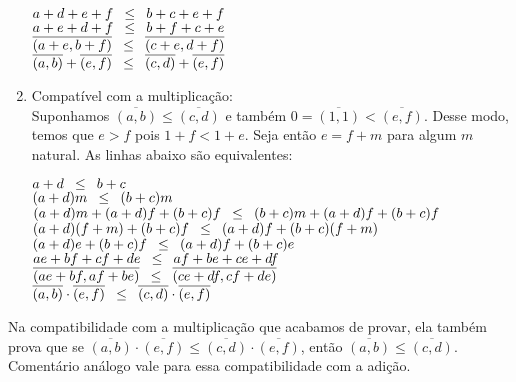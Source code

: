 \documentclass[../main.tex]{subfiles}
\begin{document}
\begin{dem}
\begin{enumerate}[label=(\roman*)]
\begin{center}
            $a + d +e+f \hspace{8pt} {\leq} \hspace{8pt} b + c + e+f$ \\
            $a + e + d +f \hspace{8pt} {\leq} \hspace{8pt} b + f + c + e$ \\
            $\overline{(a+e,b+f)} \hspace{8pt} {\leq} \hspace{8pt} \overline{(c+e, d+f)}$ \\
            $\overline{(a,b)} + \overline{(e,f)} \hspace{8pt} {\leq} \hspace{8pt} \overline{(c,d)} + \overline{(e,f)}$

        \end{center}

        
        \item Compatível com a multiplicação: \\
        Suponhamos $\overline{(a,b)} \leq \overline{(c,d)}$ e também $0 = \overline{(1,1)} < \overline{(e,f)}$.
        Desse modo, temos que $e > f$ pois $1+f < 1+e$. Seja então $e = f+m$ para algum $m$ natural. As linhas abaixo são equivalentes:
        \begin{center}
            $a+d \hspace{8pt} {\leq} \hspace{8pt} b+c  $\\
            $(a+d)m \hspace{8pt} {\leq} \hspace{8pt} (b+c)m $ \\
            $(a+d)m + (a+d)f + (b+c)f \hspace{8pt} {\leq} \hspace{8pt} (b+c)m + (a+d)f + (b+c)f$ \\
            $(a+d)(f+m) + (b+c)f \hspace{8pt} {\leq} \hspace{8pt} (a+d)f + (b+c)(f+m)$ \\
            $(a+d)e + (b+c)f \hspace{8pt} {\leq} \hspace{8pt} (a+d)f + (b+c)e$ \\
            $ae+bf + cf+de \hspace{8pt} {\leq} \hspace{8pt} af+be + ce+df  $\\
            $\overline{(ae+bf, af+be)} \hspace{8pt} {\leq} \hspace{8pt} \overline{(ce+df, cf+de)}  $ \\           
            $\overline{(a,b)} \cdot \overline{(e,f)} \hspace{8pt} {\leq} \hspace{8pt} \overline{(c,d)} \cdot \overline{(e,f)} $ 
        \end{center}        
        
    \end{enumerate}
\end{dem}
\begin{obs}
    Na compatibilidade com a multiplicação que acabamos de provar, ela também prova que se $\overline{(a,b)} \cdot \overline{(e,f)} 
    \leq \overline{(c,d)} \cdot \overline{(e,f)}$, então $\overline{(a,b)} \leq \overline{(c,d)}$. Comentário análogo vale para essa compatibilidade com a adição.
\end{obs}
\end{document}
